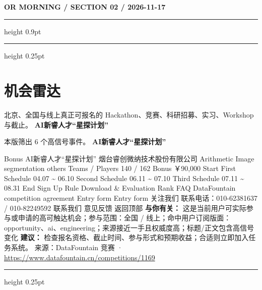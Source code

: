 \documentclass[10.5pt]{ctexart}
\begin{document}
\newpage
{\small\bfseries OR MORNING / SECTION 02 / 2026-11-17}
\vspace{2mm}
\hrule height 0.9pt
\vspace{1.5mm}
\hrule height 0.25pt
\vspace{4mm}
\section*{机会雷达}
{\color{ormuted} 北京、全国与线上真正可报名的 Hackathon、竞赛、科研招募、实习、Workshop 与截止。}
\vspace{2mm}
{\LARGE\bfseries AI新睿人才“星探计划”}\par
\vspace{1mm}
{\color{ormuted} 本版筛出 6 个高信号事件。}
\vspace{3mm}
{\Large\bfseries AI新睿人才“星探计划”}\par
Bonus AI新睿人才“星探计划” 烟台睿创微纳技术股份有限公司 Arithmetic Image segmentation others Teams / Players 140 / 162 Bonus ￥90,000 Start First Schedule 04.07 \textasciitilde{} 06.10 Second Schedule 06.11 \textasciitilde{} 07.10 Third Schedule 07.11 \textasciitilde{} 08.31 End Sign Up Rule Download \& Evaluation Rank FAQ DataFountain competition agreement Entry form Entry form 关注我们 联系电话：010-62381637 / 010-82249592 联系我们 意见反馈 返回顶部
\textbf{与你有关：} 这是当前用户可实际参与或申请的高可触达机会；参与范围：全国 / 线上；命中用户订阅版面：opportunity、ai、engineering；来源接近一手且权威度高；标题/正文包含高信号变化
\textbf{建议：} 检查报名资格、截止时间、参与形式和预期收益；合适则立即加入任务系统。
{\footnotesize\color{ormuted} 来源：DataFountain 竞赛 · \url{https://www.datafountain.cn/competitions/1169}}
\vspace{4mm}
\hrule height 0.25pt
\vspace{3mm}
\end{document}

